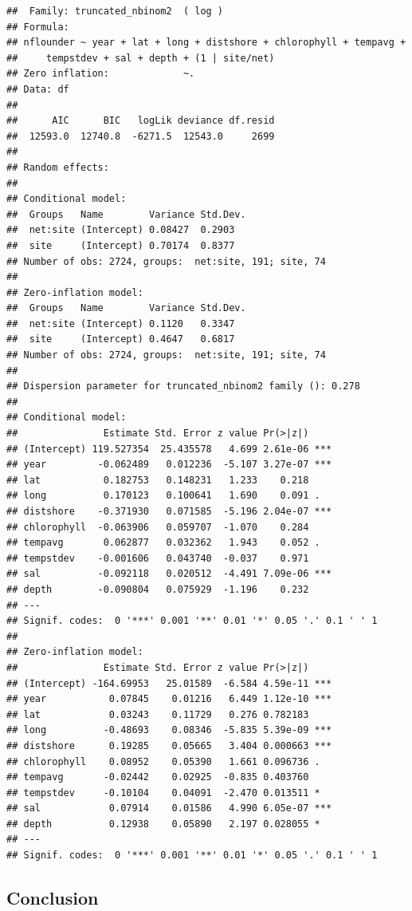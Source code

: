 \documentclass[
]{article}
\begin{document}
\begin{verbatim}
##  Family: truncated_nbinom2  ( log )
## Formula:          
## nflounder ~ year + lat + long + distshore + chlorophyll + tempavg +  
##     tempstdev + sal + depth + (1 | site/net)
## Zero inflation:             ~.
## Data: df
## 
##      AIC      BIC   logLik deviance df.resid 
##  12593.0  12740.8  -6271.5  12543.0     2699 
## 
## Random effects:
## 
## Conditional model:
##  Groups   Name        Variance Std.Dev.
##  net:site (Intercept) 0.08427  0.2903  
##  site     (Intercept) 0.70174  0.8377  
## Number of obs: 2724, groups:  net:site, 191; site, 74
## 
## Zero-inflation model:
##  Groups   Name        Variance Std.Dev.
##  net:site (Intercept) 0.1120   0.3347  
##  site     (Intercept) 0.4647   0.6817  
## Number of obs: 2724, groups:  net:site, 191; site, 74
## 
## Dispersion parameter for truncated_nbinom2 family (): 0.278 
## 
## Conditional model:
##               Estimate Std. Error z value Pr(>|z|)    
## (Intercept) 119.527354  25.435578   4.699 2.61e-06 ***
## year         -0.062489   0.012236  -5.107 3.27e-07 ***
## lat           0.182753   0.148231   1.233    0.218    
## long          0.170123   0.100641   1.690    0.091 .  
## distshore    -0.371930   0.071585  -5.196 2.04e-07 ***
## chlorophyll  -0.063906   0.059707  -1.070    0.284    
## tempavg       0.062877   0.032362   1.943    0.052 .  
## tempstdev    -0.001606   0.043740  -0.037    0.971    
## sal          -0.092118   0.020512  -4.491 7.09e-06 ***
## depth        -0.090804   0.075929  -1.196    0.232    
## ---
## Signif. codes:  0 '***' 0.001 '**' 0.01 '*' 0.05 '.' 0.1 ' ' 1
## 
## Zero-inflation model:
##               Estimate Std. Error z value Pr(>|z|)    
## (Intercept) -164.69953   25.01589  -6.584 4.59e-11 ***
## year           0.07845    0.01216   6.449 1.12e-10 ***
## lat            0.03243    0.11729   0.276 0.782183    
## long          -0.48693    0.08346  -5.835 5.39e-09 ***
## distshore      0.19285    0.05665   3.404 0.000663 ***
## chlorophyll    0.08952    0.05390   1.661 0.096736 .  
## tempavg       -0.02442    0.02925  -0.835 0.403760    
## tempstdev     -0.10104    0.04091  -2.470 0.013511 *  
## sal            0.07914    0.01586   4.990 6.05e-07 ***
## depth          0.12938    0.05890   2.197 0.028055 *  
## ---
## Signif. codes:  0 '***' 0.001 '**' 0.01 '*' 0.05 '.' 0.1 ' ' 1
\end{verbatim}

\subsection{Conclusion}\label{conclusion}
\end{document}
